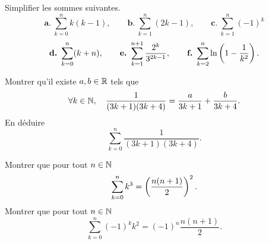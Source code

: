 \documentclass{magnolia}
\begin{document}





Simplifier les sommes suivantes.
\[\textbf{a.}\ \sum_{k=0}^n k(k-1), \qquad \textbf{b.}\ \sum_{k=1}^n (2k-1), \qquad \textbf{c.}\ \sum_{k=1}^n (-1)^k\]
\[\textbf{d.}\ \sum_{k=0}^n (k+n), \qquad \textbf{e.}\ \sum_{k=1}^{n+1} \frac{2^k}{3^{2k-1}}, \qquad
\textbf{f.}\ \sum_{k=2}^n \ln\left(1-\frac{1}{k^2}\right).\]

\begin{questions}
\question Montrer qu'il existe $a,b\in\mathbb{R}$ tels que
  \[\forall k\in\mathbb{N},\quad \frac{1}{(3k+1)(3k+4)}=\frac{a}{3k+1}+\frac{b}{3k+4}.\]
\question En déduire
  \[\sum_{k=0}^n \frac{1}{(3k+1)(3k+4)}.\]
\end{questions}

\begin{questions}
\question Montrer que pour tout $n\in\mathbb{N}$
  \[\sum_{k=0}^n k^3=\left(\frac{n(n+1)}{2}\right)^2.\]
\question Montrer que pour tout $n\in\mathbb{N}$
  \[\sum_{k=0}^n (-1)^k k^2=(-1)^n \frac{n(n+1)}{2}.\]
\end{questions}
\end{document}
